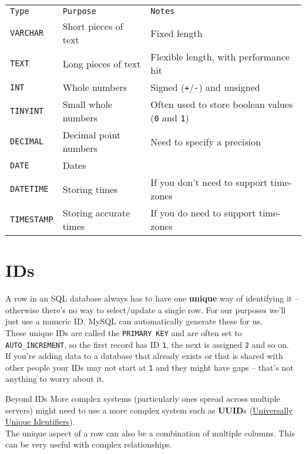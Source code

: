 \begin{small}
    \begin{tabu}{l l X}
        \texttt{Type}       & \texttt{Purpose}       & \texttt{Notes} \\
        \texttt{VARCHAR}    & Short pieces of text   & Fixed length  \\
        \texttt{TEXT}       & Long pieces of text    & Flexible length, with performance hit  \\
        \texttt{INT}        & Whole numbers          & Signed (\texttt{+}/\texttt{-}) and unsigned  \\
        \texttt{TINYINT}    & Small whole numbers    & Often used to store boolean values (\texttt{0} and \texttt{1})  \\
        \texttt{DECIMAL}    & Decimal point numbers  & Need to specify a precision \\
        \texttt{DATE}       & Dates                  &  \\
        \texttt{DATETIME}   & Storing times          & If you don't need to support time-zones \\
        \texttt{TIMESTAMP}  & Storing accurate times & If you do need to support time-zones \\
    \end{tabu}
\end{small}
\par\bigskip


\section{IDs}

A row in an SQL database always has to have one \textbf{unique} way of identifying it – otherwise there's no way to select/update a single row. For our purposes we'll just use a numeric ID. MySQL can automatically generate these for us.
\\

These unique IDs are called the \texttt{PRIMARY KEY} and are often set to \texttt{AUTO\_INCREMENT}, so the first record has ID \texttt{1}, the next is assigned \texttt{2} and so on.
\\

If you're adding data to a database that already exists or that is shared with other people your IDs may not start at \texttt{1} and they might have gaps – that's not anything to worry about it.

\begin{infobox}{Beyond IDs}
    More complex systems (particularly ones spread across multiple servers) might need to use a more complex system such as \textbf{UUID}s (\href{https://en.wikipedia.org/wiki/Universally\_unique\_identifier}{Universally Unique Identifiers}).
    \\

    The unique aspect of a row can also be a combination of multiple columns. This can be very useful with complex relationships.
\end{infobox}

